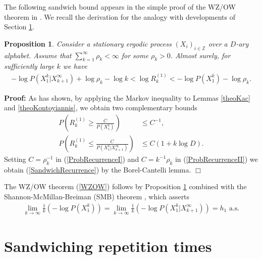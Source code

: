 \documentclass[a4paper]{article}
\newcommand{\okra}[1]{\left( #1 \right)}
\newtheorem{proposition}{Proposition}
\newenvironment*{proof}{\begin{trivlist}\item[]
\noindent\textbf{Proof:}}{$\Box$\par\end{trivlist}}
\begin{document}
The following sandwich bound appears in the simple proof of the WZ/OW
theorem in \citep[Theorem 9.12]{Debowski21}. We recall the derivation
for the analogy with developments of Section \ref{secRepetition}.
\begin{proposition}
  \label{theoSandwichRecurrence}
  Consider a stationary ergodic process $(X_i)_{i\in\mathbb{Z}}$ over
  a $D$-ary alphabet. Assume that $\sum_{k=1}^\infty \rho_k<\infty$
  for some $\rho_k>0$.  Almost surely, for sufficiently large $k$ we have
\begin{align}
  \label{SandwichRecurrence}
  -\log P(X_1^k|X_{k+1}^\infty)
  +\log \rho_k-\log k
  <
  \log R^{(1)}_k
  <
  -\log P(X_1^k)
  -\log \rho_k
  .
\end{align}
\end{proposition}
\begin{proof}
  As \citet{Kontoyiannis98} has shown, by applying the Markov
  inequality to Lemmas \ref{theoKac} and \ref{theoKontoyiannis}, we
  obtain two complementary bounds
\begin{align}
  \label{ProbRecurrenceI}
  P\okra{R^{(1)}_k\ge \frac{C}{P(X_1^k)}}&\le C^{-1}
  ,
  \\
  \label{ProbRecurrenceII}
  P\okra{R^{(1)}_k\le \frac{C}{P(X_1^k|X_{k+1}^\infty)}}&\le C(1+k\log D)
  .
\end{align}
Setting $C=\rho_k^{-1}$ in (\ref{ProbRecurrenceI}) and $C=k^{-1}\rho_k$ in
(\ref{ProbRecurrenceII}) we obtain (\ref{SandwichRecurrence}) by the
Borel-Cantelli lemma.
\end{proof}

The WZ/OW theorem (\ref{WZOW}) follows by Proposition
\ref{theoSandwichRecurrence} combined with the
Shannon-McMillan-Breiman (SMB) theorem \citep{Shannon48, Breiman57,
  Chung61, Barron85, AlgoetCover88}, which asserts
\begin{align}
  \label{SMB}
  \lim_{k\to\infty}
  \frac{1}{k}\okra{-\log P(X_1^k)}=
  \lim_{k\to\infty}
  \frac{1}{k}\okra{-\log P(X_1^k|X_{k+1}^\infty)}=
  h_1 \text{ a.s.}
\end{align}

\section{Sandwiching repetition times}
\label{secRepetition}
\end{document}

